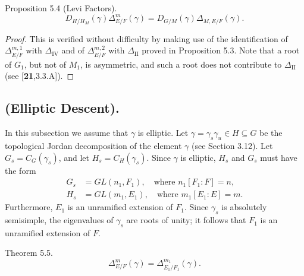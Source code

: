 \documentclass{amsart}
\begin{document}
\bigskip
\proclaim Proposition {5.4} (Levi Factors).
$$D_{H/H_M}(\gamma)\Delta^m_{E/F}(\gamma) = D_{G/M}(\gamma) 
\Delta_{M,E/F}(\gamma).$$
\finishproclaim

\begin{proof}  This is verified without difficulty by making use of the
identification of $\Delta^{m,1}_{E/F}$ with $\Delta_{\text{IV}}$ and 
of $\Delta^{m,2}_{E/F}$ with $\Delta_{\text{II}}$ proved in Proposition
5.3.  Note that a root of $G_1$, but not of $M_1$, is asymmetric,
and such a root does not contribute to $\Delta_{\text{II}}$
(see [{\bf 21},3.3.A]).
\end{proof}

\bigskip
\setcounter{subsection}{4}
\subsection{(Elliptic Descent).}
\medskip
\noindent
In this subsection we assume that $\gamma$ is elliptic.
Let
  $ \gamma = \gamma_s \gamma_u \in H \subseteq G $ be
  the topological Jordan decomposition of the element $\gamma$ (see Section 3.12).
Let
  $ G_s = C_G ( \gamma_s) $, and let $H_s =C_H(\gamma_s)$.
Since $\gamma$ is elliptic, $H_s$ and $G_s$ must have the form
\begin{align*}
  G_s &= GL(n_1,F_1),\quad \text{where } n_1[F_1:F] = n,\\
  H_s &= GL(m_1,E_1),\quad \text{where } m_1[E_1:E] = m.
\end{align*}
%
Furthermore, $E_1$ is an unramified extension of $F_1$.  Since
$\gamma_s$ is absolutely semisimple, the eigenvalues of $\gamma_s$
are roots of unity; it follows that $F_1$ is an unramified
extension of $F$.

\proclaim Theorem {5.5}.
%
$$
  \Delta_{E/F}^m (\gamma) = \Delta_{E_1/F_1}^{m_1}(\gamma).$$
%
\finishproclaim
\end{document}
